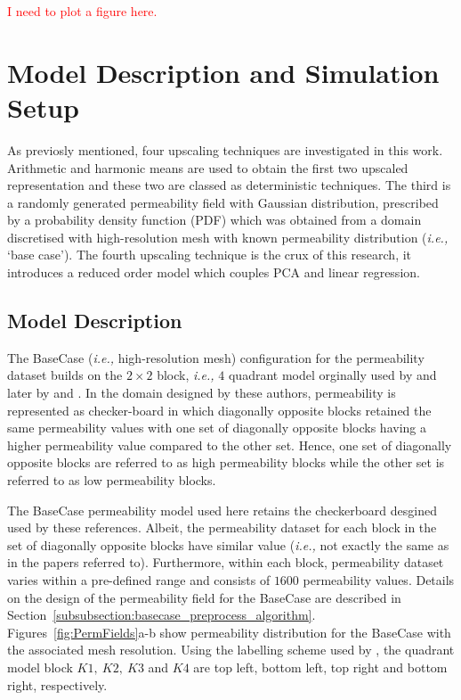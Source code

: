 \documentclass[preprint,12pt]{elsarticle}
\newcommand{\red}{\textcolor{red}}
\newcommand{\ie}{{\it i.e., }}
\begin{document}
\red{I need to plot a figure here.}



\section{Model Description and Simulation Setup}\label{section:model_simulation}

As previosly mentioned, four upscaling techniques are investigated in this work. Arithmetic and harmonic means are used to obtain the first two upscaled representation and these two are classed as deterministic techniques. The third is a randomly generated permeability field with Gaussian distribution, prescribed by a probability density function (PDF) which was obtained from a domain discretised with high-resolution mesh with known permeability distribution (\ie `base case'). The fourth upscaling technique is the crux of this research, it introduces a reduced order model which couples PCA and linear regression.

\subsection{Model Description}\label{subsection:model}
The BaseCase  (\ie high-resolution mesh) configuration for the permeability dataset builds on the $2 \times 2$ block, \ie $4$ quadrant model orginally used by \citet{Cardwell_1945} and later by \citet{Yeo2001} and \citet{dawe_2008}. In the domain designed by these authors, permeability is represented as checker-board in which diagonally opposite blocks retained the same permeability values with one set of diagonally opposite blocks having a higher permeability value compared to the other set. Hence, one set of diagonally opposite blocks are referred to as high permeability blocks while the other set is referred to as low permeability blocks.

The BaseCase permeability model used here retains the checkerboard desgined used by these references. Albeit, the permeability dataset for each block in the set of diagonally opposite blocks have similar value (\ie not exactly the same as in the papers referred to). %
Furthermore, within each block, permeability dataset varies within a pre-defined range and consists of $1600$ permeability values. Details on the design of the permeability field for the BaseCase are described in Section~\ref{subsubsection:basecase_preprocess_algorithm}. Figures~\ref{fig:PermFields}a-b show permeability distribution for the BaseCase with the associated mesh resolution.  Using the labelling scheme used by \citet{dawe_2008}, the quadrant model block $K1,~K2,~K3$ and $K4$ are top left, bottom left, top right and bottom right, respectively.
\end{document}
